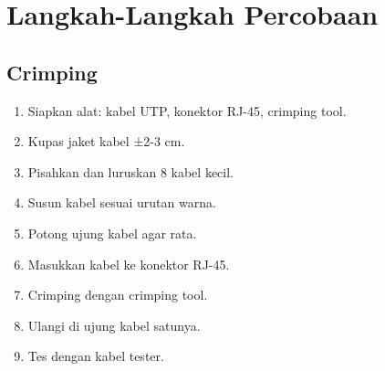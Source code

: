 \section{Langkah-Langkah Percobaan}
\subsection{Crimping}
\begin{enumerate}
    \item Siapkan alat: kabel UTP, konektor RJ-45, crimping tool.
    \item Kupas jaket kabel ±2-3 cm.
    \item Pisahkan dan luruskan 8 kabel kecil.
    \item Susun kabel sesuai urutan warna.
    \item Potong ujung kabel agar rata.
    \item Masukkan kabel ke konektor RJ-45.
    \item Crimping dengan crimping tool.
    \item Ulangi di ujung kabel satunya.
    \item Tes dengan kabel tester.
\end{enumerate}

